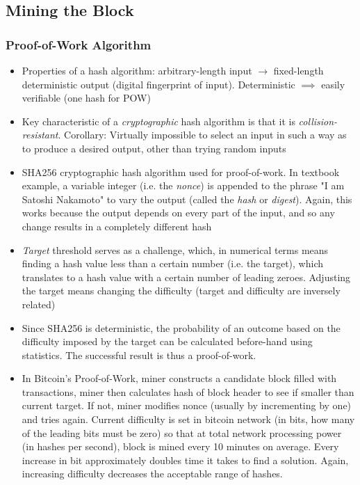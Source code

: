 \documentclass[english, 11pt]{article}
\begin{document}
\subsection{Mining the Block}
\subsubsection{Proof-of-Work Algorithm}
\begin{itemize}
    \item Properties of a hash algorithm: arbitrary-length input $\rightarrow$ fixed-length deterministic output (digital fingerprint of input). Deterministic $\implies$ easily verifiable (one hash for POW)
    \item Key characteristic of a \textit{cryptographic} hash algorithm is that it is \textit{collision-resistant}. Corollary: Virtually impossible to select an input in such a way as to produce a desired output, other than trying random inputs
    \item SHA256 cryptographic hash algorithm used for proof-of-work. In textbook example, a variable integer (i.e. the \textit{nonce}) is appended to the phrase "I am Satoshi Nakamoto" to vary the output (called the \textit{hash} or \textit{digest}). Again, this works because the output depends on every part of the input, and so any change results in a completely different hash
    \item \textit{Target} threshold serves as a challenge, which, in numerical terms means finding a hash value less than a certain number (i.e. the target), which translates to a hash value with a certain number of leading zeroes. Adjusting the target means changing the difficulty (target and difficulty are inversely related)
    \item Since SHA256 is deterministic, the probability of an outcome based on the difficulty imposed by the target can be calculated before-hand using statistics. The successful result is thus a proof-of-work.
    \item In Bitcoin's Proof-of-Work, miner constructs a candidate block filled with transactions, miner then calculates hash of block header to see if smaller than current target. If not, miner modifies nonce (usually by incrementing by one) and tries again. Current difficulty is set in bitcoin network (in bits, how many of the leading bits must be zero) so that at total network processing power (in hashes per second), block is mined every 10 minutes on average. Every increase in bit approximately doubles time it takes to find a solution. Again, increasing difficulty decreases the acceptable range of hashes.
\end{itemize}
\end{document}
